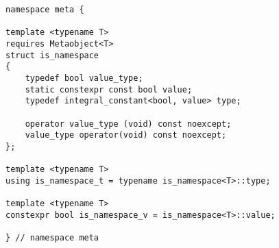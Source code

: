 
\begin{verbatim}
namespace meta {

template <typename T>
requires Metaobject<T>
struct is_namespace
{
	typedef bool value_type;
	static constexpr const bool value;
	typedef integral_constant<bool, value> type;

	operator value_type (void) const noexcept;
	value_type operator(void) const noexcept;
};

template <typename T>
using is_namespace_t = typename is_namespace<T>::type;

template <typename T>
constexpr bool is_namespace_v = is_namespace<T>::value;

} // namespace meta
\end{verbatim}
